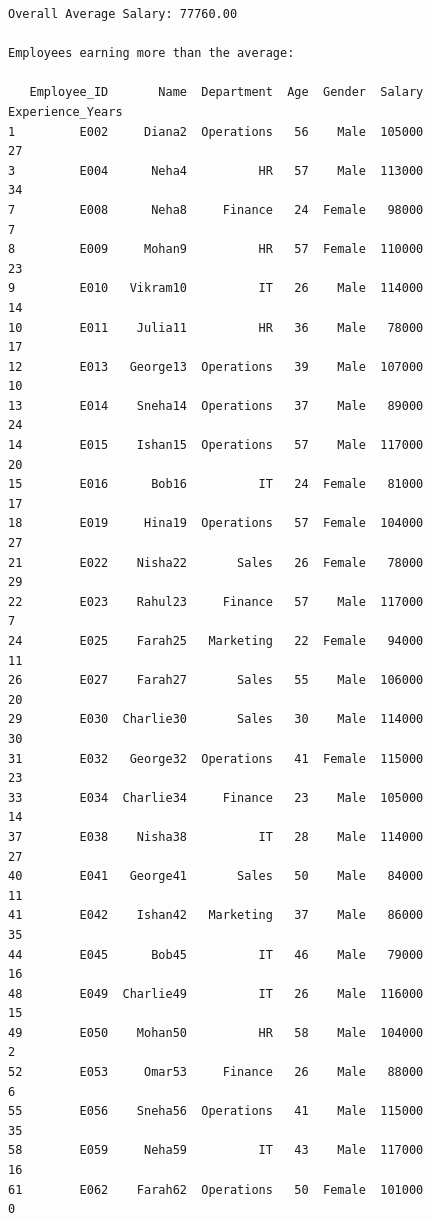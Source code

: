 \documentclass[12pt,a4paper,oneside]{report}
\begin{document}
\begin{Verbatim}[commandchars=\\\{\},breaklines=true,breakanywhere=true,fontsize=\scriptsize,frame=leftline,framesep=2mm,rulecolor=\color{gray}]
Overall Average Salary: 77760.00

Employees earning more than the average:

   Employee_ID       Name  Department  Age  Gender  Salary  Experience_Years
1         E002     Diana2  Operations   56    Male  105000                27
3         E004      Neha4          HR   57    Male  113000                34
7         E008      Neha8     Finance   24  Female   98000                 7
8         E009     Mohan9          HR   57  Female  110000                23
9         E010   Vikram10          IT   26    Male  114000                14
10        E011    Julia11          HR   36    Male   78000                17
12        E013   George13  Operations   39    Male  107000                10
13        E014    Sneha14  Operations   37    Male   89000                24
14        E015    Ishan15  Operations   57    Male  117000                20
15        E016      Bob16          IT   24  Female   81000                17
18        E019     Hina19  Operations   57  Female  104000                27
21        E022    Nisha22       Sales   26  Female   78000                29
22        E023    Rahul23     Finance   57    Male  117000                 7
24        E025    Farah25   Marketing   22  Female   94000                11
26        E027    Farah27       Sales   55    Male  106000                20
29        E030  Charlie30       Sales   30    Male  114000                30
31        E032   George32  Operations   41  Female  115000                23
33        E034  Charlie34     Finance   23    Male  105000                14
37        E038    Nisha38          IT   28    Male  114000                27
40        E041   George41       Sales   50    Male   84000                11
41        E042    Ishan42   Marketing   37    Male   86000                35
44        E045      Bob45          IT   46    Male   79000                16
48        E049  Charlie49          IT   26    Male  116000                15
49        E050    Mohan50          HR   58    Male  104000                 2
52        E053     Omar53     Finance   26    Male   88000                 6
55        E056    Sneha56  Operations   41    Male  115000                35
58        E059     Neha59          IT   43    Male  117000                16
61        E062    Farah62  Operations   50  Female  101000                 0

\end{Verbatim}
\end{document}
